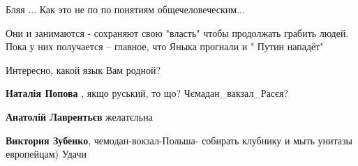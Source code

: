 \begin{itemize}
Бляя ... Как это не по по понятиям общечеловеческим...

 
Они и занимаются - сохраняют свою "власть" чтобы продолжать грабить людей. Пока
у них получается – главное, что Яныка прогнали и " Путин нападёт"


 
Интересно, какой язык Вам родной?

\begin{itemize}
 
\textbf{Наталія Попова} , якщо руський, то що? Чємадан\_вакзал\_Расєя?

 
\textbf{Анатолій Лаврентьєв} желатєльна

 
\textbf{Виктория Зубенко}, чемодан-вокзал-Польша- собирать клубнику и мыть унитазы европейцам) Удачи
\end{itemize}

 

\end{itemize}
